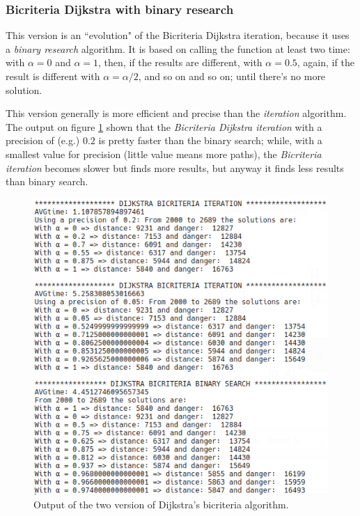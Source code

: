 \documentclass[a4paper,11pt]{report}
\begin{document}
\subsubsection{Bicriteria Dijkstra with binary research}
This version is an ``evolution" of the Bicriteria Dijkstra iteration, because it uses a \textit{binary research} algorithm. It is based on calling the function at least two time: with $\alpha = 0$ and $\alpha=1$, then, if the results are different, with $\alpha=0.5$, again, if the result is different with $\alpha=\alpha/2$, and so on and so on; until there's no more solution.

This version generally is more efficient and precise than the \textit{iteration} algorithm. The output on figure \ref{fig:dijkstraBiCriteriaSimple} shown that the \textit{Bicriteria Dijkstra iteration} with a precision of (e.g.) $0.2$ is pretty faster than the binary search; while, with a smallest value for precision (little value means more paths), the \textit{Bicriteria iteration} becomes slower but finds more results, but anyway it finds less results than binary search.

\begin{figure}[h]
	\centering
	\includegraphics[width=\linewidth]{img/biCriteriaOutput.png}
	\caption{Output of the two version of Dijkstra's bicriteria algorithm.}
	\label{fig:dijkstraBiCriteriaSimple}
\end{figure}
\end{document}
